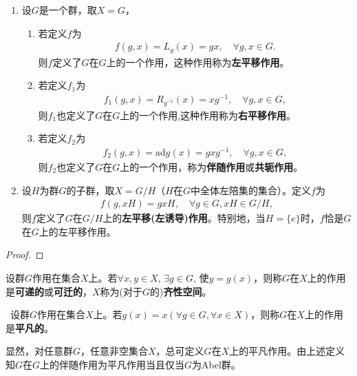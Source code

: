 \documentclass[../../main.tex]{subfiles}%
\begin{document}
\begin{theorem}\label{theorem:一些常见的群作用的良定义性}
\begin{enumerate}
\item 设$G$是一个群，取$X = G$，
\begin{enumerate}
\item 若定义$f$为
\begin{align*}
f(g, x) = L_g(x) = gx, \quad \forall g, x \in G.
\end{align*}
则$f$定义了$G$在$G$上的一个作用，这种作用称为\textbf{左平移作用}。

\item 若定义$f_1$为
\begin{align*}
f_1(g, x) = R_{g^{-1}}(x) = xg^{-1}, \quad \forall g, x \in G,
\end{align*}
则$f_1$也定义了$G$在$G$上的一个作用,这种作用称为\textbf{右平移作用}。

\item 若定义$f_2$为
\begin{align*}
f_2(g, x) = \text{ad}g(x) = gxg^{-1}, \quad \forall g, x \in G,
\end{align*}
则$f_2$也定义了$G$在$G$上的一个作用，称为\textbf{伴随作用}或\textbf{共轭作用}。
\end{enumerate}

\item 设$H$为群$G$的子群，取$X = G/H$（$H$在$G$中全体左陪集的集合）。定义$f$为
\begin{align*}
f(g, xH) = gxH, \quad \forall g \in G, xH \in G/H,
\end{align*}
则$f$定义了$G$在$G/H$上的\textbf{左平移(左诱导)作用}。特别地，当$H = \{e\}$时，$f$恰是$G$在$G$上的左平移作用。
\end{enumerate}

\end{theorem}
\begin{proof}



\end{proof}

\begin{definition}
设群$G$作用在集合$X$上。若$\forall x, y \in X$, $\exists g \in G$, 使$y = g(x)$，则称$G$在$X$上的作用是\textbf{可递的}或\textbf{可迁的}，$X$称为(对于$G$的)\textbf{齐性空间}。
\end{definition}

\begin{definition}\
设群$G$作用在集合$X$上。若$g(x) = x(\forall g \in G, \forall x \in X)$，则称$G$在$X$上的作用是\textbf{平凡的}。
\end{definition}
\begin{remark}
显然，对任意群$G$，任意非空集合$X$，总可定义$G$在$X$上的平凡作用。由上述定义知$G$在$G$上的伴随作用为平凡作用当且仅当$G$为Abel群。

\end{remark}
\end{document}
